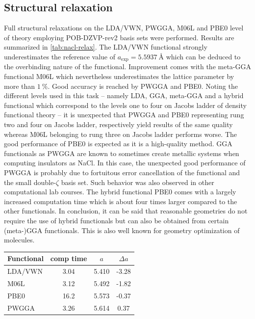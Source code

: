 \documentclass[a4paper,12pt,parskip=half]{scrartcl}
\begin{document}
\subsection{Structural relaxation}
%
Full structural relaxations on the LDA/VWN\autocite[]{lda-vwn}, PWGGA\autocite[]{pwgga}, M06L\autocite[]{m06l} and PBE0\autocite[]{pbe0} level of theory employing POB-DZVP-rev2 basis sets\autocite[]{pob-xzvp-rev2} were performed. Results are summarized in \autoref{tab:nacl-relax}. The LDA/VWN functional strongly underestimates the reference value of $ a_\mathrm{exp} = \SI{5.5937}{\angstrom} $ which can be deduced to the overbinding nature of the functional. Improvement comes with the meta-GGA functional M06L which nevertheless underestimates the lattice parameter by more than $ \SI{1}{\percent} $. Good accuracy is reached by PWGGA and PBE0. Noting the different levels used in this task -- namely LDA, GGA, meta-GGA and a hybrid functional which correspond to the levels one to four on Jacobs ladder of density functional theory -- it is unexpected that PWGGA and PBE0 representing rung two and four on Jacobs ladder, respectively yield results of the same quality whereas M06L belonging to rung three on Jacobs ladder performs worse. The good performance of PBE0 is expected as it is a high-quality method. GGA functionals as PWGGA are known to sometimes create metallic systems when computing insulators as NaCl. In this case, the unexpected good performance of PWGGA is probably due to fortuitous error cancellation of the functional and the small double-$ \zeta $ basis set. Such behavior was also observed in other computational lab courses. 
The hybrid functional PBE0 comes with a largely increased computation time which is about four times larger compared to the other functionals. In conclusion, it can be said that reasonable geometries do not require the use of hybrid functionals but can also be obtained from certain (meta-)GGA functionals. This is also well known for geometry optimization of molecules.\autocite[]{tpss,r2-scan-3c}

%
\begin{table}
	\centering
	\label{tab:nacl-relax}
	\begin{tabular}{lccc}
		\toprule
		Functional & comp time & $a $  & $ \Delta a $ \\
		\midrule
		LDA/VWN    & 3.04      & 5.410 & -3.28        \\
		M06L       & 3.12      & 5.492 & -1.82        \\
		PBE0       & 16.2      & 5.573 & -0.37        \\
		PWGGA      & 3.26      & 5.614 & 0.37         \\
		\bottomrule
	\end{tabular}
\end{table}
%
\end{document}
